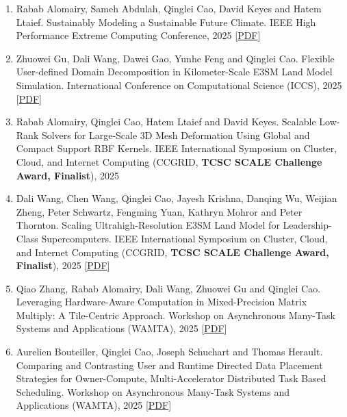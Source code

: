 \documentclass{resume} %
\let\OrigRSection\rSection
\let\OrigEndRSection\endrSection
\let\OrigMakeUppercase\MakeUppercase
\renewenvironment{rSection}[1]{
    \renewcommand{\MakeUppercase}[1]{\textcolor{blue}{\OrigMakeUppercase{##1}}}%
    \OrigRSection{#1}%
}{%
    \OrigEndRSection%
}
\begin{document}
\begin{rSection}{\faBook~Publications}
\begin{itemize}
\begin{enumerate}[leftmargin=8pt, align=left]
    \item Rabab Alomairy, Sameh Abdulah, Qinglei Cao, David Keyes and Hatem Ltaief. Sustainably Modeling a Sustainable Future Climate. IEEE High Performance Extreme Computing Conference, 2025 \hfill[\href{https://qingleicao.com/papers/Sustainably Modeling a Sustainable Future Climate.pdf}{PDF}]
    \item Zhuowei Gu, Dali Wang, Dawei Gao, Yunhe Feng and Qinglei Cao. Flexible User-defined Domain Decomposition in Kilometer-Scale E3SM Land Model Simulation. International Conference on Computational Science (ICCS), 2025 \hfill[\href{https://qingleicao.com/papers/Flexible User-defined Domain Decomposition in Kilometer-Scale E3SM Land Model Simulation.pdf}{PDF}]
    \item Rabab Alomairy, Qinglei Cao, Hatem Ltaief and David Keyes. Scalable Low-Rank Solvers for Large-Scale 3D Mesh Deformation Using Global and Compact Support RBF Kernels. IEEE International Symposium on Cluster, Cloud, and Internet Computing (CCGRID, {\bf TCSC SCALE Challenge Award, Finalist}), 2025
    \item Dali Wang, Chen Wang, Qinglei Cao, Jayesh Krishna, Danqing Wu, Weijian Zheng, Peter Schwartz, Fengming Yuan, Kathryn Mohror and Peter Thornton. Scaling Ultrahigh-Resolution E3SM Land Model for Leadership-Class Supercomputers. IEEE International Symposium on Cluster, Cloud, and Internet Computing (CCGRID, {\bf TCSC SCALE Challenge Award, Finalist}), 2025 \hfill[\href{https://qingleicao.com/papers/Scaling Ultrahigh-Resolution E3SM Land Model for Leadership-Class Supercomputers.pdf}{PDF}]
    \item Qiao Zhang, Rabab Alomairy, Dali Wang, Zhuowei Gu and Qinglei Cao. Leveraging Hardware-Aware Computation in Mixed-Precision Matrix Multiply: A Tile-Centric Approach. Workshop on Asynchronous Many-Task Systems and Applications (WAMTA), 2025 \hfill[\href{https://qingleicao.com/papers/2025-wamta-Leveraging Hardware-Aware Computation in Mixed-Precision Matrix Multiply A Tile-Centric Approach.pdf}{PDF}]
    \item Aurelien Bouteiller, Qinglei Cao, Joseph Schuchart and Thomas Herault. Comparing and Contrasting User and Runtime Directed Data Placement Strategies for Owner-Compute, Multi-Accelerator Distributed Task Based Scheduling. Workshop on Asynchronous Many-Task Systems and Applications (WAMTA), 2025 \hfill[\href{https://qingleicao.com/papers/2025-wamta-Comparing and Contrasting User and Runtime Directed Data Placement Strategies for Owner-Compute, Multi-accelerator Distributed Task Based Scheduling.pdf}{PDF}]

\end{enumerate}
\end{itemize}
\end{rSection}
\end{document}
